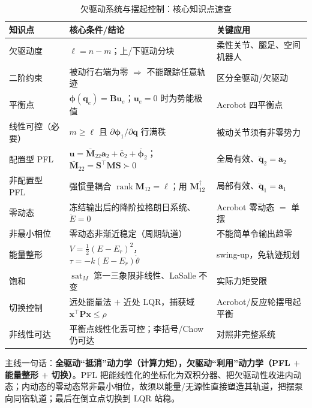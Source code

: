 \begin{table}[H]
\centering
\caption{欠驱动系统与摆起控制：核心知识点速查}
\label{tab:ua-summary}
\small
\begin{tabular}{lll}
\toprule
知识点 & 核心条件/结论 & 关键应用 \\
\midrule
欠驱动度 & $\ell=n-m$；上/下驱动分块 & 柔性关节、腿足、空间机器人 \\
二阶约束 & 被动行右端为零 $\Rightarrow$ 不能跟踪任意轨迹 & 区分全驱动/欠驱动 \\
平衡点 & $\boldsymbol{\phi}(\mathbf{q}_e)=\mathbf{B}\mathbf{u}_e$；$\mathbf{u}_e{=}0$ 时为势能极值 & Acrobot 四平衡点 \\
线性可控（必要） & $m\ge\ell$ 且 $\partial\boldsymbol{\phi}_{1}/\partial\mathbf{q}$ 行满秩 & 被动关节须有非零势力 \\
配置型 PFL & $\mathbf{u}{=}\bar{\mathbf{M}}_{22}\mathbf{a}_2{+}\bar{\mathbf{c}}_2{+}\bar{\boldsymbol{\phi}}_2$；$\bar{\mathbf{M}}_{22}{=}\mathbf{S}^\top\mathbf{M}\mathbf{S}\succ0$ & 全局有效、$\ddot{\mathbf{q}}_2{=}\mathbf{a}_2$ \\
非配置型 PFL & 强惯量耦合 $\operatorname{rank}\mathbf{M}_{12}{=}\ell$；用 $\mathbf{M}_{12}^{\dagger}$ & 局部有效、$\ddot{\mathbf{q}}_1{=}\mathbf{a}_1$ \\
零动态 & 冻结输出后的降阶拉格朗日系统、$\dot{E}{=}0$ & Acrobot 零动态 $=$ 单摆 \\
非最小相位 & 零动态非渐近稳定（周期轨道） & 不能简单令输出趋零 \\
能量整形 & $V{=}\tfrac12(E{-}E_r)^2$，$\tau{=}{-}k(E{-}E_r)\dot{\theta}$ & swing-up，免轨迹规划 \\
饱和 & $\operatorname{sat}_M$ 第一三象限非线性、LaSalle 不变 & 实际力矩受限 \\
切换控制 & 远处能量法 $+$ 近处 LQR，捕获域 $\mathbf{x}^\top\mathbf{P}\mathbf{x}{\le}\rho$ & Acrobot/反应轮摆甩起平衡 \\
非线性可达 & 平衡点线性化丢可控；李括号/Chow 仍可达 & 对照非完整系统 \\
\bottomrule
\end{tabular}
\end{table}

主线一句话：\textbf{全驱动“抵消”动力学（计算力矩），欠驱动“利用”动力学（PFL $+$ 能量整形 $+$ 切换）}。PFL 把能线性化的坐标化为双积分器、把欠驱动性收进内动态；内动态的零动态常非最小相位，故须以能量/无源性直接塑造其轨道，把摆泵向同宿轨道；最后在倒立点切换到 LQR 站稳。

